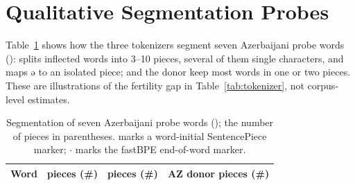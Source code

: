\section{Qualitative Segmentation Probes}
\label{app:probes}
Table~\ref{tab:probes} shows how the three tokenizers segment seven Azerbaijani probe words (): \xlmxv{} splits inflected words into 3–10 pieces, several of them single characters, and maps ə to an isolated piece; \xlmr{} and the donor keep most words in one or two pieces. These are illustrations of the fertility gap in Table~\ref{tab:tokenizer}, not corpus-level estimates.

\begin{table}[!t]
\caption{Segmentation of seven Azerbaijani probe words (); the number of pieces in parentheses. \textvisiblespace{} marks a word-initial SentencePiece marker; $\cdot$ marks the fastBPE end-of-word marker.}
\label{tab:probes}
\centering
\scriptsize
\setlength{\tabcolsep}{2.5pt}
\begin{tabular}{@{}llll@{}}
\toprule
Word & \xlmxv{} pieces (\#) & \xlmr{} pieces (\#) & AZ donor pieces (\#) \\
\midrule

\end{tabular}
\end{table}
